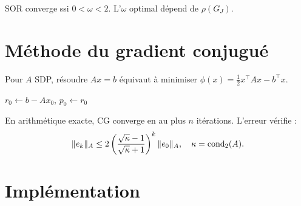 \begin{theoreme}
SOR converge ssi $0<\omega<2$. L'$\omega$ optimal d\'epend de $\rho(G_J)$.
\end{theoreme}

\section{M\'ethode du gradient conjugu\'e}

\begin{definition}
Pour $A$ SDP, r\'esoudre $Ax=b$ \'equivaut \`a minimiser $\phi(x)=\frac{1}{2}x^\top Ax-b^\top x$.
\end{definition}

\begin{algorithm}[H]
\caption{Gradient conjugu\'e}\label{alg:cg}
$r_0\gets b-Ax_0$, $p_0\gets r_0$\;
\end{algorithm}

\begin{theoreme}
En arithm\'etique exacte, CG converge en au plus $n$ it\'erations. L'erreur v\'erifie :
\[
\|e_k\|_A \leq 2\left(\frac{\sqrt{\kappa}-1}{\sqrt{\kappa}+1}\right)^k\|e_0\|_A, \quad \kappa=\mathrm{cond}_2(A).
\]
\end{theoreme}

\section{Impl\'ementation}

